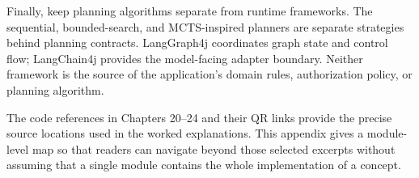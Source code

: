 Finally, keep planning algorithms separate from runtime frameworks. The sequential, bounded-search, and MCTS-inspired planners are separate strategies behind planning contracts. LangGraph4j coordinates graph state and control flow; LangChain4j provides the model-facing adapter boundary. Neither framework is the source of the application's domain rules, authorization policy, or planning algorithm.

\begin{notebox}
The code references in Chapters 20--24 and their QR links provide the precise source locations used in the worked explanations. This appendix gives a module-level map so that readers can navigate beyond those selected excerpts without assuming that a single module contains the whole implementation of a concept.
\end{notebox}
